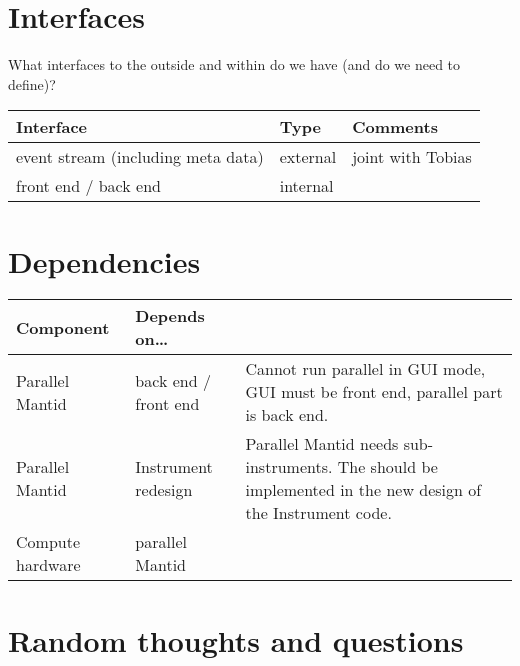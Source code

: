 \documentclass[a4paper,english,numbers=noenddot,bibliography=totoc,chapterprefix=on,DIV=12]{scrartcl}
\begin{document}
\section{Interfaces}

What interfaces to the outside and within do we have (and do we need to define)?\\
\begin{tabularx}{\textwidth}{llX}
    \hline
    \hline
    Interface & Type & Comments \\
    \hline
    \hline
    event stream (including meta data) & external & joint with Tobias \\
    front end / back end & internal & \\
    \hline
    \hline
\end{tabularx}



\section{Dependencies}

\begin{tabularx}{\textwidth}{llX}
    \hline
    \hline
    Component & Depends on\dots & \\
    \hline
    \hline
    Parallel Mantid & back end / front end & Cannot run parallel in GUI mode, GUI must be front end, parallel part is back end. \\
    Parallel Mantid & Instrument redesign & Parallel Mantid needs sub-instruments. The should be implemented in the new design of the Instrument code. \\
    Compute hardware & parallel Mantid \\
    \hline
    \hline
\end{tabularx}

\section{Random thoughts and questions}
\end{document}
